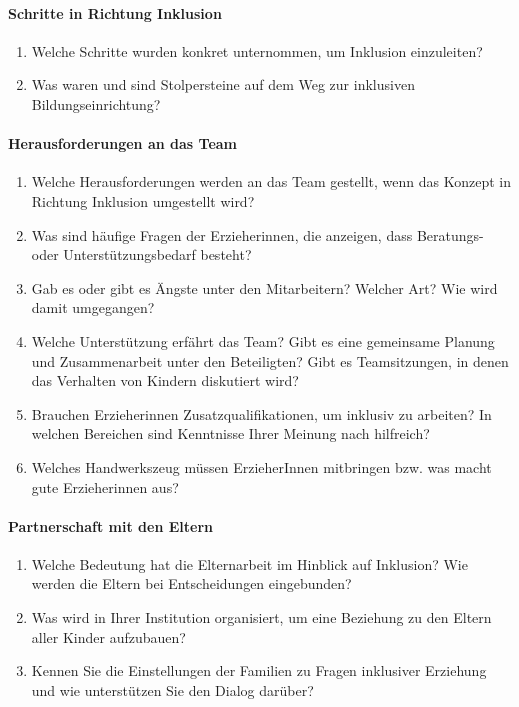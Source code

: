 \paragraph{Schritte in Richtung Inklusion}
\begin{enumerate}
\item Welche Schritte wurden konkret unternommen, um Inklusion einzuleiten?
\item Was waren und sind Stolpersteine auf dem Weg zur inklusiven Bildungseinrichtung? 
\end{enumerate}

\paragraph{Herausforderungen an das Team}
\begin{enumerate}
\item Welche Herausforderungen werden an das Team gestellt, wenn das Konzept in Richtung Inklusion umgestellt wird?
\item Was sind häufige Fragen der Erzieherinnen, die anzeigen, dass Beratungs- oder Unterstützungsbedarf besteht?
\item Gab es oder gibt es Ängste unter den Mitarbeitern? Welcher Art? Wie wird damit umgegangen?
\item Welche Unterstützung erfährt das Team? 
Gibt es eine gemeinsame Planung und Zusammenarbeit unter den Beteiligten? Gibt es Teamsitzungen, in denen das Verhalten von Kindern diskutiert wird? 
\item Brauchen Erzieherinnen Zusatzqualifikationen, um inklusiv zu arbeiten? 
In welchen Bereichen sind Kenntnisse Ihrer Meinung nach hilfreich?
\item Welches Handwerkszeug müssen ErzieherInnen mitbringen bzw. was macht gute Erzieherinnen aus?
\end{enumerate}

\paragraph{Partnerschaft mit den Eltern}
\begin{enumerate}
\item Welche Bedeutung hat die Elternarbeit im Hinblick auf Inklusion?
Wie werden die Eltern bei Entscheidungen eingebunden? 
\item Was wird in Ihrer Institution organisiert, um eine Beziehung zu den Eltern aller Kinder aufzubauen?
\item Kennen Sie die Einstellungen der Familien zu Fragen inklusiver Erziehung und wie unterstützen Sie den Dialog darüber?
\end{enumerate}

